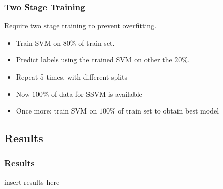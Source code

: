 \begin{frame}
\frametitle{Two Stage Training}
Require two stage training to prevent overfitting.
\begin{itemize}
\item Train SVM on $80\%$ of train set.
\item Predict labels using the trained SVM on other the $20\%$.
\item Repeat 5 times, with different splits
\item Now $100\%$ of data for SSVM is available
\item Once more: train SVM on $100\%$ of train set to obtain best model
\end{itemize}
\end{frame}

\subsection{Results}

\begin{frame}
\frametitle{Results}
insert results here
\end{frame}
